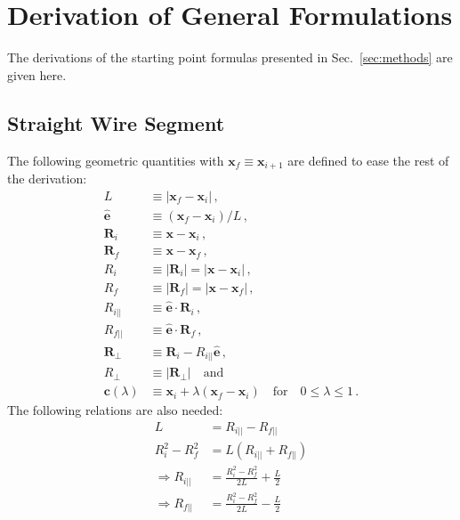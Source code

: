 \section{Derivation of General Formulations}
\label{apx:derivation_of_general_formulations}
The derivations of the starting point formulas presented in Sec.~\ref{sec:methods} are given here.

\subsection{Straight Wire Segment}
The following geometric quantities with $\mathbf{x}_f \equiv \mathbf{x}_{i+1}$ are defined to ease the rest of the derivation:
\begin{align}
 L                   & \equiv | \mathbf{x}_f - \mathbf{x}_i | \, , \\
 \hat{\mathbf{e}}    & \equiv \left(\mathbf{x}_f - \mathbf{x}_i\right) / L \, , \\
 \mathbf{R}_i        & \equiv \mathbf{x} - \mathbf{x}_i \, , \\
 \mathbf{R}_f        & \equiv \mathbf{x} - \mathbf{x}_f \, , \\
 R_i                 & \equiv | \mathbf{R}_i | = | \mathbf{x} - \mathbf{x}_i | \, , \\
 R_f                 & \equiv | \mathbf{R}_f | = | \mathbf{x} - \mathbf{x}_f | \, , \\
 R_{i ||}            & \equiv \hat{\mathbf{e}} \cdot \mathbf{R}_i \, , \\
 R_{f ||}            & \equiv \hat{\mathbf{e}} \cdot \mathbf{R}_f \, , \\
 \mathbf{R}_\perp    & \equiv \mathbf{R}_i - R_{i ||} \hat{\mathbf{e}} \, , \\
 R_\perp             & \equiv | \mathbf{R}_\perp | \quad \mathrm{and} \\
 \mathbf{c}(\lambda) & \equiv \mathbf{x}_i + \lambda \left(\mathbf{x}_f - \mathbf{x}_i\right) \quad \mathrm{for} \quad 0 \leq \lambda \leq 1 \, .
\end{align}
The following relations are also needed:
\begin{align}
       L             & = R_{i ||} - R_{f ||} \\
       R_i^2 - R_f^2 & = L \left( R_{i ||} + R_{f ||} \right) \\
\Rightarrow R_{i ||} & = \frac{R_i^2 - R_f^2}{2 L} + \frac{L}{2} \\
\Rightarrow R_{f ||} & = \frac{R_i^2 - R_f^2}{2 L} - \frac{L}{2}
\end{align}

